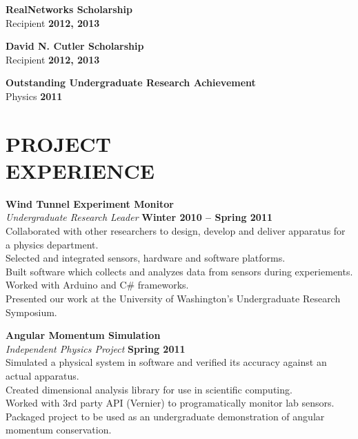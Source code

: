 \documentclass[margin,line]{resume}
\begin{document}
\begin{resume}
    \textbf{\listing RealNetworks Scholarship}\\
    Recipient \hfill \textbf{2012, 2013}

    \textbf{\listing David N. Cutler Scholarship}\\
    Recipient \hfill \textbf{2012, 2013}

    \textbf{\listing Outstanding Undergraduate Research Achievement}\\
    Physics \hfill \textbf{2011}

\sectionline

    \section{\mysidestyle \textbf{\large{P}\small{ROJECT\\EXPERIENCE}}}

    \textbf{\listing Wind Tunnel Experiment Monitor} \vspace{2mm}\\\vspace{1mm}%
    \textsl{Undergraduate Research Leader} \hfill \textbf{Winter 2010 -- Spring 2011}\\
    Collaborated with other researchers to design, develop and deliver apparatus for a physics department.\\
    Selected and integrated sensors, hardware and software platforms.\\
    Built software which collects and analyzes data from sensors during experiements.\\
    Worked with Arduino and C\# frameworks.\\
    Presented our work at the University of Washington's Undergraduate Research Symposium.

    \textbf{\listing Angular Momentum Simulation} \vspace{2mm}\\\vspace{1mm}%
    \textsl{Independent Physics Project} \hfill \textbf{Spring 2011}\\
    Simulated a physical system in software and verified its accuracy against an actual apparatus.\\
    Created dimensional analysis library for use in scientific computing.\\
    Worked with 3rd party API (Vernier) to programatically monitor lab sensors.\\
    Packaged project to be used as an undergraduate demonstration of angular momentum conservation.


\end{resume}
\end{document}
